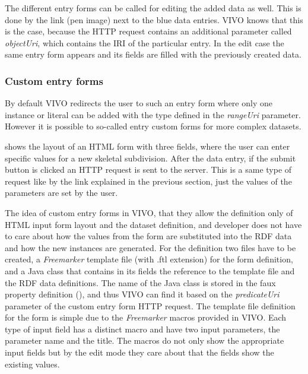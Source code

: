 The different entry forms can be called for editing the added data as well. This is done by the link (pen image) next to the blue data entries. VIVO knows that this is the case, because the HTTP request contains an additional parameter called \textit{objectUri}, which contains the IRI of the particular entry. In the edit case the same entry form appears and its fields are filled with the previously created data.

\subsubsection{Custom entry forms} \label{vivoCef}

By default VIVO redirects the user to such an entry form where only one instance or literal can be added with the type defined in the \textit{rangeUri} parameter. However it is possible to so-called entry custom forms for more complex datasets.


 shows the layout of an HTML form with three fields, where the user can enter specific values for a new skeletal subdivision. After the data entry, if the submit button is clicked an HTTP request is sent to the server. This is a same type of request like by the link explained in the previous section, just the values of the parameters are set by the user.

The idea of custom entry forms in VIVO, that they allow the definition only of HTML input form layout and the dataset definition, and developer does not have to care about how the values from the form are substituted into the RDF data and how the new instances are generated. For the definition two files have to be created, a \textit{Freemarker}  template file (with .ftl extension) for the form definition, and a Java class that contains in its fields the reference to the template file and the RDF data definitions. The name of the Java class is stored in the faux property definition (), and thus VIVO can find it based on the \textit{predicateUri} parameter of the custom entry form HTTP request. The template file definition for the form is simple due to the \textit{Freemarker} macros provided in VIVO. Each type of input field has a distinct macro and have two input parameters, the parameter name and the title. The macros do not only show the appropriate input fields but by the edit mode they care about that the fields show the existing values.

